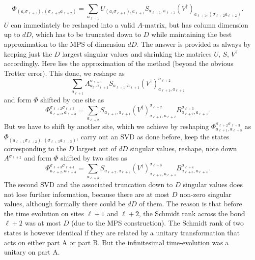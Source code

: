 \begin{equation}
\Phi_{(a_\ell \sigma_{\ell+1}),(\sigma_{\ell+2} a_{\ell+2})} = \sum_{a_{\ell+1}} U_{(a_\ell \sigma_{\ell+1}),a_{\ell+1}} S_{a_{\ell+1},a_{\ell+1}} (V^\dagger)_{a_{\ell+1}, (\sigma_{\ell+2} a_{\ell+2})}.
\end{equation}
$U$ can immediately be reshaped into a valid $A$-matrix, but has column dimension up to $dD$, which has to be truncated down to $D$ while maintaining the best approximation to the MPS of dimension $dD$. The answer is provided as always by keeping just the $D$ largest singular values and shrinking the matrices $U$, $S$, $V^\dagger$ accordingly. Here lies the approximation of the method (beyond the obvious Trotter error). This done, we reshape as
\begin{equation}
\sum_{a_{\ell+1}} A^{\sigma_{\ell+1}}_{a_\ell, a_{\ell+1}}  S_{a_{\ell+1},a_{\ell+1}} (V^\dagger)^{\sigma_{\ell+2}}_{a_{\ell+1},  a_{\ell+2}}
\end{equation}
and form $\Phi$ shifted by one site as
\begin{equation}
\Phi^{\sigma_{\ell+2}\sigma_{\ell+3}}_{a_{\ell+1},a_{\ell+3}} = \sum_{a_{\ell+2}} S_{a_{\ell+1},a_{\ell+1}} (V^\dagger)^{\sigma_{\ell+2}}_{a_{\ell+1},  a_{\ell+2}} B^{\sigma_{\ell+3}}_{a_{\ell+2},  a_{\ell+3}} .
\end{equation}
But we have to shift by another site, which we achieve by reshaping $\Phi^{\sigma_{\ell+2}\sigma_{\ell+3}}_{a_{\ell+1},a_{\ell+3}}$ as $\Phi_{(a_{\ell+1}\sigma_{\ell+2}),(\sigma_{\ell+3} a_{\ell+3})}$, carry out an SVD as done before, keep the states corresponding to the $D$ largest out of $dD$ singular values, reshape, note down $A^{\sigma_{\ell+2}}$ and form $\Phi$ shifted by two sites as
\begin{equation}
\Phi^{\sigma_{\ell+3}\sigma_{\ell+4}}_{a_{\ell+2},a_{\ell+4}} = \sum_{a_{\ell+3}} S_{a_{\ell+2},a_{\ell+2}} (V^\dagger)^{\sigma_{\ell+3}}_{a_{\ell+2},  a_{\ell+3}} B^{\sigma_{\ell+4}}_{a_{\ell+3},  a_{\ell+4}} .
\end{equation}
The second SVD and the associated truncation down to $D$ singular values does not lose further information, because there are at most $D$ non-zero singular values, although formally there could be $dD$ of them. The reason is that before the time evolution on sites $\ell+1$ and $\ell+2$, the Schmidt rank across the bond $\ell+2$ was at most $D$ (due to the MPS construction). The Schmidt rank of two states is however identical if they are related by a unitary transformation that acts on either part A or part B. But the infinitesimal time-evolution was a unitary on part A.


